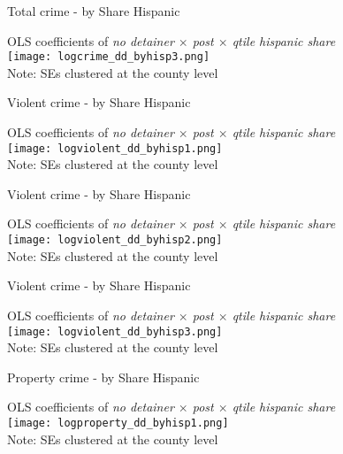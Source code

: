 \documentclass[xcolor=pdftex,dvipsnames,table,handout]{beamer}
\begin{document}
\begin{frame}{Total crime - by Share Hispanic}
\footnotesize
\begin{center}
OLS coefficients of \textit{no detainer $\times$ post $\times$ qtile hispanic share}\\
\texttt{[image: logcrime\_dd\_byhisp3.png]}\\
\footnotesize{Note: SEs clustered at the county level}
\end{center}
\end{frame}

\begin{frame}{Violent crime - by Share Hispanic}
\footnotesize
\begin{center}
OLS coefficients of \textit{no detainer $\times$ post $\times$ qtile hispanic share}\\
\texttt{[image: logviolent\_dd\_byhisp1.png]}\\
\footnotesize{Note: SEs clustered at the county level}
\end{center}
\end{frame}

\begin{frame}{Violent crime - by Share Hispanic}
\footnotesize
\begin{center}
OLS coefficients of \textit{no detainer $\times$ post $\times$ qtile hispanic share}\\
\texttt{[image: logviolent\_dd\_byhisp2.png]}\\
\footnotesize{Note: SEs clustered at the county level}
\end{center}
\end{frame}

\begin{frame}{Violent crime - by Share Hispanic}
\footnotesize
\begin{center}
OLS coefficients of \textit{no detainer $\times$ post $\times$ qtile hispanic share}\\
\texttt{[image: logviolent\_dd\_byhisp3.png]}\\
\footnotesize{Note: SEs clustered at the county level}
\end{center}
\end{frame}

\begin{frame}{Property crime - by Share Hispanic}
\footnotesize
\begin{center}
OLS coefficients of \textit{no detainer $\times$ post $\times$ qtile hispanic share}\\
\texttt{[image: logproperty\_dd\_byhisp1.png]}\\
\footnotesize{Note: SEs clustered at the county level}
\end{center}
\end{frame}
\end{document}
